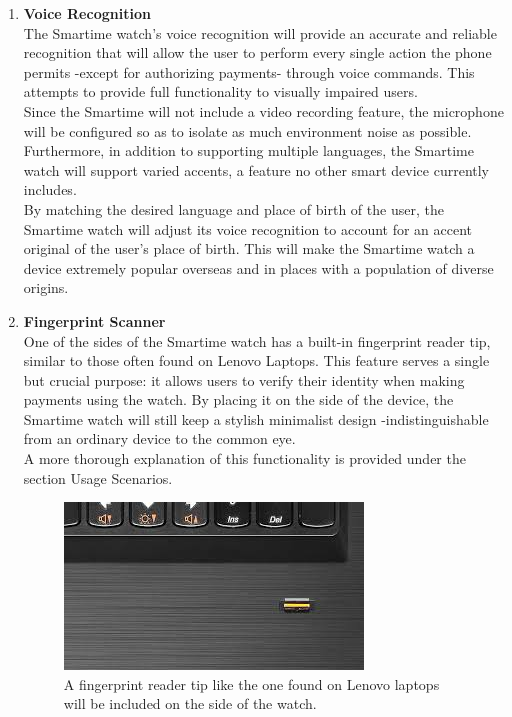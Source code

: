 \documentclass{article}
\begin{document}
\begin{enumerate}
\item \textbf{Voice Recognition }\\
The Smartime watch's voice recognition will provide an accurate and reliable recognition that will allow the user to perform every single action the phone permits -except for authorizing payments- through voice commands. This attempts to provide full functionality to visually impaired users.\\ 

Since the Smartime will not include a video recording feature, the microphone will be configured so as to isolate as much environment noise as possible. Furthermore, in addition to supporting multiple languages, the Smartime watch will support varied accents, a feature no other smart device currently includes.\\ 

By matching the desired language and place of birth of the user, the Smartime watch will adjust its voice recognition to account for an accent original of the user's place of birth. This will make the Smartime watch a device extremely popular overseas and in places with a population of diverse origins.

\item \textbf{Fingerprint Scanner}\\
One of the sides of the Smartime watch has a built-in fingerprint reader tip, similar to those often found on Lenovo Laptops. This feature serves a single but crucial purpose: it allows users to verify their identity when making payments using the watch.  By placing it on the side of the device, the Smartime watch will still keep a stylish minimalist design -indistinguishable from an ordinary device to the common eye.\\

A more thorough explanation of this functionality is provided under the section Usage Scenarios. 

\begin{figure}[h]
\centering
\includegraphics[width=3 in]{lenovo_reader.jpg}
\caption {A fingerprint reader tip like the one found on Lenovo laptops will be included on the side of the watch.}
\end{figure}
\end{enumerate}
\end{document}
